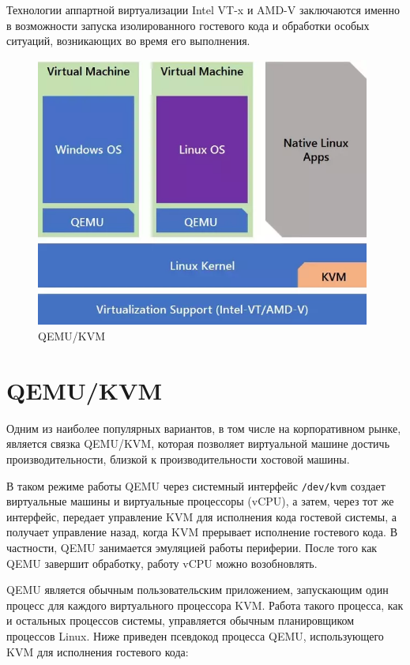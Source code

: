 \documentclass{mipt-thesis-bs}
\begin{document}
Технологии аппартной виртуализации Intel VT-x и AMD-V заключаются именно в возможности запуска изолированного гостевого кода и обработки особых ситуаций, возникающих во время его выполнения.

\begin{figure}[h]
\begin{center}
    \includegraphics[width=11cm]{qemukvm.png}
    \caption{QEMU/KVM}
    \label{fig:qemukvm}
\end{center}
\end{figure}

\section*{QEMU/KVM}

Одним из наиболее популярных вариантов, в том числе на корпоративном рынке, является связка QEMU/KVM, которая позволяет виртуальной машине достичь производительности, близкой к производительности хостовой машины.

В таком режиме работы QEMU через системный интерфейс \texttt{/dev/kvm} создает виртуальные машины и виртуальные процессоры (vCPU), а затем, через тот же интерфейс, передает управление KVM для исполнения кода гостевой системы, а получает управление назад, когда KVM прерывает исполнение гостевого кода\cite{qemu-kvm-arch}. В частности, QEMU занимается эмуляцией работы периферии\cite{qemu-devices}. После того как QEMU завершит обработку, работу vCPU можно возобновлять.

QEMU является обычным пользовательским приложением, запускающим один процесс для каждого виртуального процессора KVM. Работа такого процесса, как и остальных процессов системы, управляется обычным планировщиком процессов Linux\cite{qemu-kvm-arch}. Ниже приведен псевдокод процесса QEMU, использующего KVM для исполнения гостевого кода:
\end{document}
